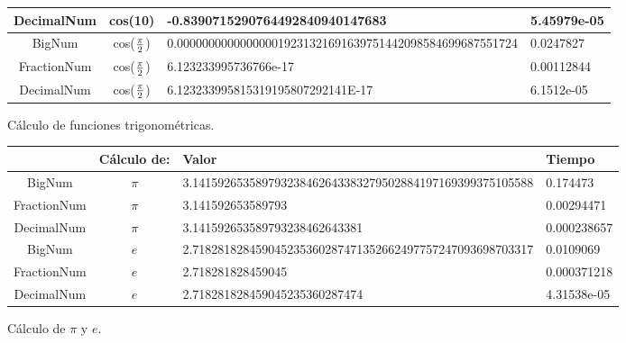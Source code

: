 \documentclass[a4paper,10pt,twocolumn]{article}
\begin{document}
\begin{figure}[!htbp]
\begin{center}
\begin{tabular}{|c|c|l|l|}
DecimalNum  	& cos(10) 
			& -0.8390715290764492840940147683                            			& 5.45979e-05  
			\\ \hline
			
	BigNum  	& cos($\pi\over 2$)  										
			& 0.000000000000000019231321691639751442098584699687551724  
			& 0.0247827   
			\\ \hline
			
FractionNum 	& cos($\pi\over 2$)
			& 6.123233995736766e-17                                     			& 0.00112844  
			\\ \hline
			
DecimalNum  	& cos($\pi\over 2$)
			& 6.123233995815319195807292141E-17                         			& 6.1512e-05  
			\\ \hline
			
\end{tabular}
		\caption{Cálculo de funciones trigonométricas. \label{fig:ex}}
		\end{center}
	\end{figure}
	
	
	\begin{figure}[h!]%
		\begin{center}
			\begin{tabular}{|c|c|l|l|} \hline
			
			&Cálculo de:
			& Valor 	    
			& Tiempo	
			\\ \hline
			
	BigNum  	& $\pi$
			& 3.141592653589793238462643383279502884197169399375105588  			& 0.174473     
			\\ \hline
			
FractionNum 	& $\pi$
			& 3.141592653589793                                         			& 0.00294471   
			\\ \hline
			
DecimalNum  	& $\pi$ 
			& 3.141592653589793238462643381                             			& 0.000238657  
			\\ \hline
			
	BigNum  	& $e$
			& 2.718281828459045235360287471352662497757247093698703317  			& 0.0109069    
			\\ \hline
			
FractionNum 	& $e$
			& 2.718281828459045                                         			& 0.000371218  
			\\ \hline
			
DecimalNum  	& $e$
			& 2.718281828459045235360287474                             			& 4.31538e-05  
			\\ \hline

\end{tabular}
		\caption{Cálculo de $\pi$ y $e$. \label{fig:ex}}
		\end{center}
	\end{figure}
	
\end{document}
